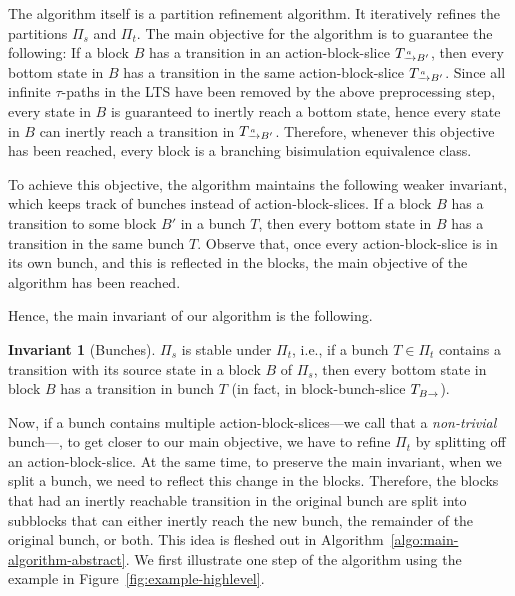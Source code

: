 \documentclass[a4paper,10pt]{article}
\theoremstyle{definition}
\newtheorem{invariant}[definition]{Invariant}
\theoremstyle{plain}
\newcommand{\pijl}[1]{\mathrel{\text{$\xrightarrow{\smash[t]{#1}}$}}}
\newcommand{\TB}{T_{B\pijl{}}}
\newcommand{\TaB}{T_{\pijl{a} B'}}
\begin{document}
The algorithm itself is a partition refinement algorithm. It iteratively refines the partitions $\Pi_s$ and $\Pi_t$.
The main objective for the algorithm is to guarantee the following:
If a block $B$ has a transition in an action-block-slice $\TaB$, then every bottom state in $B$ has a transition in the same action-block-slice $\TaB$.
Since all infinite $\tau$-paths in the LTS have been removed by the above preprocessing step,
every state in $B$ is guaranteed to inertly reach a bottom state,
hence every state in $B$ can inertly reach a transition in $\TaB$.
Therefore, whenever this objective has been reached, every block is a branching bisimulation equivalence class.

To achieve this objective, the algorithm maintains the following weaker invariant,
which keeps track of bunches instead of action-block-slices.
If a block $B$ has a transition to some block $B'$ in a bunch $T$,
then every bottom state in $B$ has a transition in the same bunch $T$.
Observe that, once every action-block-slice is in its own bunch, and this is reflected in the blocks, the main objective of the algorithm has been reached.

Hence, the main invariant of our algorithm is the following.
%
\begin{invariant}[Bunches]
	\label{inv:bunches}
	$\Pi_s$ is stable under $\Pi_t$, i.e.,
	if a bunch $T \in \Pi_t$ contains a transition with its source state in a block $B$ of $\Pi_s$, then every bottom state in block $B$ has a transition in bunch
	$T$ (in fact, in block-bunch-slice $\TB$).
\end{invariant}
%
Now, if a bunch contains multiple action-block-slices---we call that a \emph{non-trivial} bunch---, to get closer to our main objective, we have to refine $\Pi_t$ by splitting off an action-block-slice.
At the same time, to preserve the main invariant, when we split a bunch, we need to reflect this change in the blocks. Therefore, the blocks that had an inertly reachable transition in the original bunch are split into subblocks that can either inertly reach the new bunch, the remainder of the original bunch, or both.
This idea is fleshed out in Algorithm~\ref{algo:main-algorithm-abstract}.
We first illustrate one step of the algorithm using the example in Figure~\ref{fig:example-highlevel}.
\end{document}
